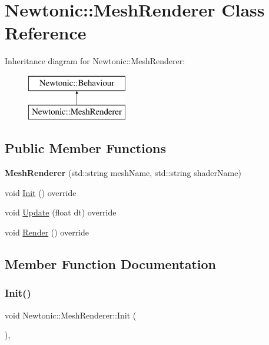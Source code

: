\hypertarget{classNewtonic_1_1MeshRenderer}{}\section{Newtonic\+::Mesh\+Renderer Class Reference}
\label{classNewtonic_1_1MeshRenderer}
Inheritance diagram for Newtonic\+::Mesh\+Renderer\+:\begin{figure}[H]
\begin{center}
\leavevmode
\includegraphics[height=2.000000cm]{classNewtonic_1_1MeshRenderer}
\end{center}
\end{figure}
\subsection*{Public Member Functions}
\begin{DoxyCompactItemize}
\item 
\mbox{\label{classNewtonic_1_1MeshRenderer_a6e5648feabd565e9609c636e2ddc235e}} 
{\bfseries Mesh\+Renderer} (std\+::string mesh\+Name, std\+::string shader\+Name)
\item 
void \mbox{\hyperlink{classNewtonic_1_1MeshRenderer_a3a29014cde2e7911162ec729f9d4ed43}{Init}} () override
\item 
void \mbox{\hyperlink{classNewtonic_1_1MeshRenderer_aaa8628b208cc9615d9b3ad91c9d06c4e}{Update}} (float dt) override
\item 
void \mbox{\hyperlink{classNewtonic_1_1MeshRenderer_a5b996a9b972ba45363c84f667f302217}{Render}} () override
\end{DoxyCompactItemize}


\subsection{Member Function Documentation}
\mbox{\label{classNewtonic_1_1MeshRenderer_a3a29014cde2e7911162ec729f9d4ed43}} 
\subsubsection{\texorpdfstring{Init()}{Init()}}
{\footnotesize\ttfamily void Newtonic\+::\+Mesh\+Renderer\+::\+Init (\begin{DoxyParamCaption}{ }\end{DoxyParamCaption})\hspace{0.3cm}{\ttfamily [override]}, {\ttfamily [virtual]}}

